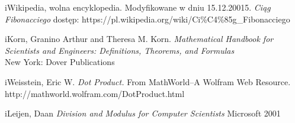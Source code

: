 \begin{thebibliography}{99}
\bibitem  iWikipedia, wolna encyklopedia. Modyfikowane w dniu 15.12.20015. 
\emph{Ciąg Fibonacciego}
dostęp: https://pl.wikipedia.org/wiki/Ci\%C4\%85g\_Fibonacciego

\bibitem iKorn, Granino Arthur and Theresa M. Korn. 
\emph{Mathematical Handbook for Scientists and Engineers: Definitions, Theorems, and Formulas}\\
New York: Dover Publications

\bibitem iWeisstein, Eric W.
\emph{Dot Product.} 
From MathWorld--A Wolfram Web Resource. http://mathworld.wolfram.com/DotProduct.html

\bibitem iLeijen, Daan
\emph{Division and Modulus for Computer Scientists}
Microsoft 2001
\end{thebibliography}

